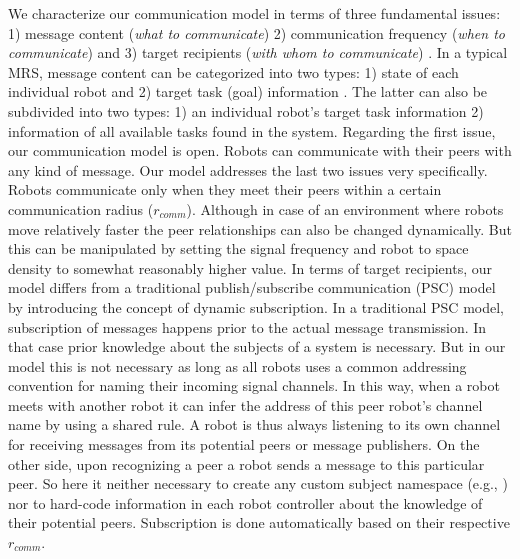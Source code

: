 \documentclass[letterpaper, 10 pt, conference]{ieeeconf}  %
\begin{document}
We characterize our communication model in terms of three fundamental issues: 1) message content ({\em what to communicate}) 2) communication frequency ({\em when to communicate}) and 3) target recipients ({\em with whom to communicate}) \cite{Gerkey}. In a typical MRS, message content can be categorized into two types: 1) state of each individual robot and 2) target task (goal) information \cite{Balch}. The latter can also be subdivided into two types: 1) an individual robot's target task information 2) information of all available tasks found in the system. Regarding the first issue, our communication model is open. Robots can communicate with their peers with any kind of message. Our model addresses the last two issues very specifically. Robots communicate only when they meet their peers within a certain communication radius ($r_{comm}$). Although in case of an environment where robots move relatively faster the peer relationships can also be changed dynamically. But this can be manipulated by setting the signal frequency and robot to space density to somewhat reasonably higher value. In terms of target recipients, our model differs from a traditional publish/subscribe communication (PSC) model by introducing the concept of dynamic subscription. In a traditional PSC model, subscription of messages happens prior to the actual message transmission. In that case prior knowledge about the subjects of a system is necessary. But in our model this is not necessary as long as all robots uses a common addressing convention for naming their incoming signal channels. In this way, when a robot meets with another robot it can infer the address of this peer robot's channel name by using a shared rule. A robot is thus always listening to its own channel for receiving messages from its potential peers or message publishers. On the other side, upon recognizing a peer a robot sends a message to this particular peer. So here it neither necessary to create any custom subject namespace (e.g., \cite{Gerkey}) nor to hard-code information in each robot controller about the knowledge of their potential peers. Subscription is done automatically based on their respective $r_{comm}$.
%
\end{document}
